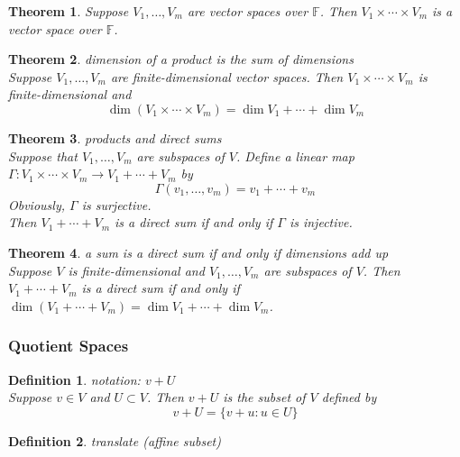 \documentclass{article}
\newtheorem{theorem}{Theorem}[subsection]
\newtheorem{definition}{Definition}[subsection]
\newcommand{\FF}{\mathbb{F}}
\begin{document}
\begin{CJK}{UTF8}{gkai}
\begin{theorem}
    Suppose $V_1,\ldots,V_m$ are vector spaces over $\FF$. Then $V_1 \times \cdots \times V_m$ is a vector
    space over $\FF$.\\
\end{theorem}

\begin{theorem}
    dimension of a product is the sum of dimensions\\

    Suppose $V_1,\ldots,V_m$ are finite-dimensional vector spaces. Then $V_1 \times \cdots \times V_m$ is finite-dimensional and
    \[\dim(V_1 \times \cdots\times V_m) = \dim V_1 +\cdots+ \dim V_m\]
\end{theorem}

\begin{theorem}
    products and direct sums\\

    Suppose that $V_1,\ldots,V_m$ are subspaces of $V$. Define a linear map $ \Gamma : V_1 \times\cdots\times V_m \to V_1+\cdots+V_m $ by
    \[\Gamma (v_1, \ldots,v_m) = v_1 +\cdots+v_m\]
    Obviously, $\Gamma$ is surjective.\\

    Then $V_1 +\cdots+V_m$ is a direct sum if and only if $\Gamma$  is injective.
\end{theorem}

\begin{theorem}
    a sum is a direct sum if and only if dimensions add up\\

    Suppose $V$ is finite-dimensional and $V_1,\ldots,V_m$ are subspaces of $V$. Then $V_1 +\cdots+V_m $ is a direct sum if and only if $\dim(V_1 + \cdots+V_m) = \dim V_1 +\cdots+\dim V_m$.\\
\end{theorem}

\subsubsection{Quotient Spaces}
\begin{definition}
    notation: $v + U$\\

    Suppose $v \in V$ and $U \subset V$. Then $v + U$ is the subset of $V$ defined by
    \[v + U =\{v + u : u\in U\}\]
   
\end{definition}

\begin{definition}
    translate (affine subset)\\


\end{definition}
\end{CJK}
\end{document}
